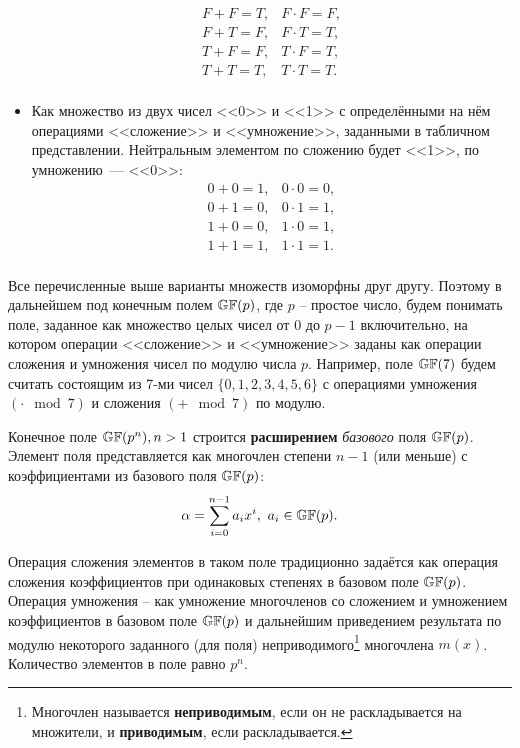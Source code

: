 \begin{itemize}
\[\begin{array}{ll}
	F + F = T,	& 	F \cdot F = F, \\
	F + T = F,	& 	F \cdot T = T, \\
	T + F = F,	& 	T \cdot F = T, \\
	T + T = T,	& 	T \cdot T = T. \\
\end{array}\]
	\item Как множество из двух чисел <<0>> и <<1>> с определёнными на нём операциями <<сложение>> и <<умножение>>, заданными в табличном представлении. Нейтральным элементом по сложению будет <<1>>, по умножению~--- <<0>>:
\[\begin{array}{ll}
	0 + 0 = 1,	& 	0 \cdot 0 = 0, \\
	0 + 1 = 0,	& 	0 \cdot 1 = 1, \\
	1 + 0 = 0,	& 	1 \cdot 0 = 1, \\
	1 + 1 = 1,	& 	1 \cdot 1 = 1. \\
\end{array}\]
\end{itemize}

Все перечисленные выше варианты множеств изоморфны друг другу. Поэтому в дальнейшем под конечным полем $\mathbb{GF}(p)$, где $p$ -- простое число, будем понимать поле, заданное как множество целых чисел от $0$ до $p-1$ включительно, на котором операции <<сложение>> и <<умножение>> заданы как операции сложения и умножения чисел по модулю числа $p$. Например, поле $\mathbb{GF}(7)$ будем считать состоящим из 7-ми чисел $\{0, 1, 2, 3, 4, 5, 6\}$ с операциями умножения $(\cdot \mod 7)$ и сложения $(+ \mod 7)$ по модулю.

Конечное поле $\mathbb{GF}(p^n), n > 1$ строится \textbf{расширением} \emph{базового} поля $\mathbb{GF}(p)$. Элемент поля представляется как многочлен степени $n-1$ (или меньше) с коэффициентами из базового поля $\mathbb{GF}(p)$:
    \[ \alpha = \sum\limits_{i=0}^{n-1} a_i x^i, ~ a_i \in \mathbb{GF}(p). \]

Операция сложения элементов в таком поле традиционно задаётся как операция сложения коэффициентов при одинаковых степенях в базовом поле $\mathbb{GF}(p)$. Операция умножения -- как умножение многочленов со сложением и умножением коэффициентов в базовом поле $\mathbb{GF}(p)$ и дальнейшим приведением результата по модулю некоторого заданного (для поля) неприводимого\footnote{Многочлен называется \textbf{неприводимым}, если он не раскладывается на множители, и \textbf{приводимым}, если раскладывается.} многочлена $m(x)$. Количество элементов в поле равно $p^n$.

